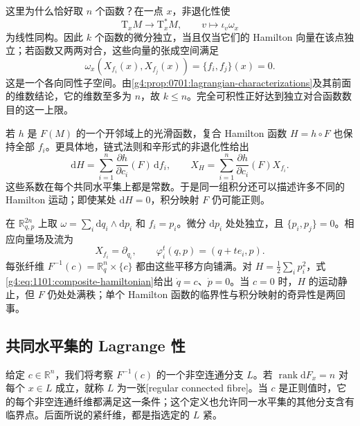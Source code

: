 \ProseParagraphBreak

这里为什么恰好取 \(n\) 个函数？在一点 \(x\)，非退化性使
\[
	\mathrm{T}_xM\longrightarrow\mathrm{T}_x^*M,
	\qquad v\longmapsto\iota_v\omega_x
\]
为线性同构。因此 \(k\) 个函数的微分独立，当且仅当它们的 Hamilton 向量在该点独立；若函数又两两对合，这些向量的张成空间满足
\[
	\omega_x(X_{f_i}(x),X_{f_j}(x))=\{f_i,f_j\}(x)=0.
\]
这是一个各向同性子空间。由\cref{g4:prop:0701:lagrangian-characterizations}及其前面的维数结论，它的维数至多为 \(n\)，故 \(k\leq n\)。完全可积性正好达到独立对合函数数目的这一上限。

\ProseParagraphBreak

若 \(h\) 是 \(F(M)\) 的一个开邻域上的光滑函数，复合 Hamilton 函数 \(H=h\circ F\) 也保持全部 \(f_i\)。更具体地，链式法则和辛形式的非退化性给出
\begin{equation}\label{g4:eq:1101:composite-hamiltonian}
	\mathrm{d}H=\sum_{i=1}^n
	\frac{\partial h}{\partial c_i}(F)\,\mathrm{d}f_i,
	\qquad
	X_H=\sum_{i=1}^n
	\frac{\partial h}{\partial c_i}(F)X_{f_i}.
\end{equation}
这些系数在每个共同水平集上都是常数。于是同一组积分还可以描述许多不同的 Hamilton 运动；即使某处 \(\mathrm{d}H=0\)，积分映射 \(F\) 仍可能正则。

\begin{example}\label{g4:exm:1101:momentum-fibres}
	在 \(\mathbb R^{2n}_{q,p}\) 上取 \(\omega=\sum_i\mathrm{d}q_i\wedge\mathrm{d}p_i\) 和 \(f_i=p_i\)。微分 \(\mathrm{d}p_i\) 处处独立，且 \(\{p_i,p_j\}=0\)。相应向量场及流为
	\[
		X_{f_i}=\partial_{q_i},\qquad
		\varphi_i^t(q,p)=(q+t e_i,p).
	\]
	每张纤维 \(F^{-1}(c)=\mathbb R^n_q\times\{c\}\) 都由这些平移方向铺满。对 \(H=\frac12\sum_i p_i^2\)，式\eqref{g4:eq:1101:composite-hamiltonian}给出 \(\dot q=c\)、\(\dot p=0\)。当 \(c=0\) 时，\(H\) 的运动静止，但 \(F\) 仍处处满秩；单个 Hamilton 函数的临界性与积分映射的奇异性是两回事。
\end{example}

\subsection{共同水平集的 Lagrange 性}
\label{g4:subsec:1101:02}

给定 \(c\in\mathbb R^n\)，我们将考察 \(F^{-1}(c)\) 的一个非空连通分支 \(L\)。若 \(\operatorname{rank}\mathrm{d}F_x=n\) 对每个 \(x\in L\) 成立，就称 \(L\) 为一张[regular connected fibre]。当 \(c\) 是正则值时，它的每个非空连通纤维都满足这一条件；这个定义也允许同一水平集的其他分支含有临界点。后面所说的紧纤维，都是指选定的 \(L\) 紧。


